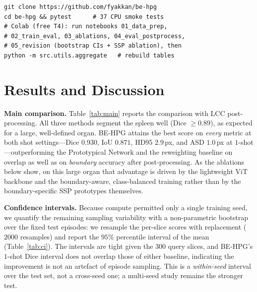 \documentclass[conference]{IEEEtran}
\begin{document}
{\footnotesize
\begin{verbatim}
git clone https://github.com/fyakkan/be-hpg
cd be-hpg && pytest      # 37 CPU smoke tests
# Colab (free T4): run notebooks 01_data_prep,
# 02_train_eval, 03_ablations, 04_eval_postprocess,
# 05_revision (bootstrap CIs + SSP ablation), then
python -m src.utils.aggregate   # rebuild tables
\end{verbatim}}

\section{Results and Discussion}



\textbf{Main comparison.} Table~\ref{tab:main} reports the comparison with LCC post-processing.
All three methods segment the spleen well (Dice $\ge 0.89$), as expected for a large, well-defined
organ. BE-HPG attains the best score on \emph{every} metric at both shot settings---Dice $0.930$,
IoU $0.871$, HD95 $2.9$\,px, and ASD $1.0$\,px at $1$-shot---outperforming the Prototypical Network
and the reweighting baseline on overlap as well as on \emph{boundary} accuracy after
post-processing. As the ablations below show, on this large organ that advantage is driven by the
lightweight ViT backbone and the boundary-aware, class-balanced training rather than by the
boundary-specific SSP prototypes themselves.



\textbf{Confidence intervals.} Because compute permitted only a single training seed, we quantify
the remaining sampling variability with a non-parametric bootstrap over the fixed test episodes:
we resample the per-slice scores with replacement ($2000$ resamples) and report the $95\%$
percentile interval of the mean (Table~\ref{tab:ci}). The intervals are tight given the $300$
query slices, and BE-HPG's $1$-shot Dice interval does not overlap those of either baseline,
indicating the improvement is not an artefact of episode sampling. This is a \emph{within-seed}
interval over the test set, not a cross-seed one; a multi-seed study remains the stronger test.


\end{document}
